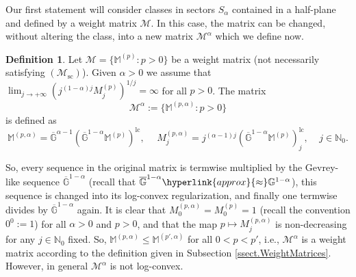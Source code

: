 \documentclass[11pt,a4paper]{article}
\theoremstyle{plain}
\theoremstyle{definition}
\newtheorem{definition}[proposition]{Definition}
\newtheorem{remark}[proposition]{Remark}
\newcommand{\NN}{\mathbb{N}}
\newcommand{\M}{\mathbb{M}}
\newcommand{\G}{\mathbb{G}}
\let\on=\operatorname
\def\a{\alpha}
\begin{document}
Our first statement will consider classes in sectors $S_\a$ contained in a half-plane and defined by a weight matrix $\mathcal{M}$. In this case, the matrix can be changed, without altering the class, into a new matrix $\mathcal{M}^\a$ which we define now.

{
\begin{definition}
Let $\mathcal{M}=\{\M^{(p)}: p>0\}$ be a weight matrix (not necessarily satisfying \hyperlink{Msc}{$(\mathcal{M}_{\on{sc}})$}). Given $\alpha>0$ we assume that $\lim_{j\rightarrow+\infty}(j^{(1-\alpha)j}M^{(p)}_j)^{1/j}=\infty$ for all $p>0$. The matrix
\begin{equation*}%
	\mathcal{M}^{\alpha}:=\{\M^{(p,\alpha)}: p>0\}
\end{equation*}
is defined as
\begin{equation}\label{ramiequ}
\M^{(p,\alpha)}=\overline{\G}^{\alpha-1}\left(\overline{\G}^{1-\alpha}\M^{(p)}\right)^{\on{lc}},
\hspace{15pt}
M^{(p,\alpha)}_j=j^{(\alpha-1)j}\left(\overline{\G}^{1-\alpha}\M^{(p)}\right)^{\on{lc}}_j,
\;\;\;\;j\in\NN_0.
\end{equation}
\end{definition}
}

So, every sequence in the original matrix is termwise multiplied by the Gevrey-like sequence $\overline{\G}^{1-\alpha}$ (recall that $\overline{\G}^{1-\alpha}\hyperlink{approx}{\approx}\G^{1-\alpha}$), this sequence is changed into its log-convex regularization, and finally one termwise divides by $\overline{\G}^{1-\alpha}$ again.
It is clear that $M^{(p,\alpha)}_0=M^{(p)}_0=1$ (recall the convention $0^0:=1$) for all $\alpha>0$ and $p>0$, and that the map $p\mapsto M^{(p,\alpha)}_j$ is non-decreasing for any $j\in\NN_0$ fixed.
So, $\M^{(p,\alpha)}\le \M^{(p',\alpha)}$ for all $0<p< p'$, i.e., $\mathcal{M}^{\alpha}$ is a weight matrix according to the definition given in Subsection \ref{ssect.WeightMatrices}. However, in general $\mathcal{M}^{\alpha}$ is not log-convex.
\end{document}
